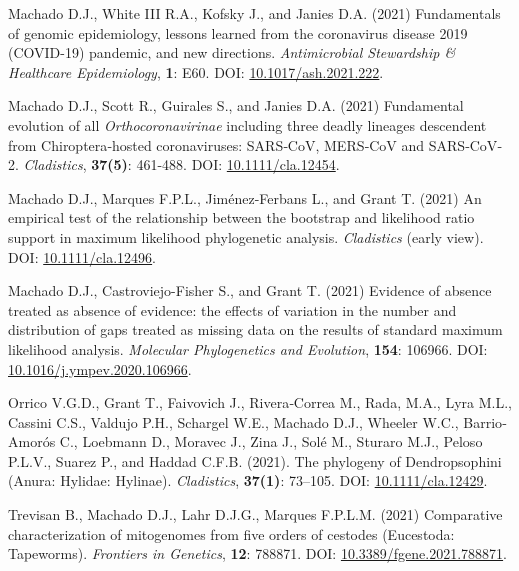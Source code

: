 \documentclass[11pt, letterpaper, sans]{moderncv}
\begin{document}
    {\setlength{\parskip}{.5em}\renewcommand{\baselinestretch}{2.0}\begin{hangparas}{.25in}{1}

		Machado D.J., White III R.A., Kofsky J., and Janies D.A. (2021) Fundamentals of genomic epidemiology, lessons learned from the coronavirus disease 2019 (COVID-19) pandemic, and new directions. \textit{Antimicrobial Stewardship \& Healthcare Epidemiology}, \textbf{1}: E60. DOI: \href{https://doi.org/10.1017/ash.2021.222}{10.1017/ash.2021.222}.

		Machado D.J., Scott R., Guirales S., and Janies D.A. (2021) Fundamental evolution of all \emph{Orthocoronavirinae} including three deadly lineages descendent from Chiroptera‐hosted coronaviruses: SARS‐CoV, MERS‐CoV and SARS‐CoV‐2. \emph{Cladistics}, \textbf{37(5)}: 461-488. DOI: \href{https://doi.org/10.1111/cla.12454}{10.1111/cla.12454}.

		Machado D.J., Marques F.P.L., Jiménez-Ferbans L., and Grant T. (2021) An empirical test of the relationship between the bootstrap and likelihood ratio support in maximum likelihood phylogenetic analysis. \textit{Cladistics} (early view). DOI: \href{https://doi.org/10.1111/cla.12496}{10.1111/cla.12496}.

		Machado D.J., Castroviejo-Fisher S., and Grant T. (2021) Evidence of absence treated as absence of evidence: the effects of variation in the number and distribution of gaps treated as missing data on the results of standard maximum likelihood analysis. \emph{Molecular Phylogenetics and Evolution}, \textbf{154}: 106966. DOI: \href{https://doi.org/10.1016/j.ympev.2020.106966}{10.1016/j.ympev.2020.106966}.

        Orrico V.G.D., Grant T., Faivovich J., Rivera‐Correa M., Rada, M.A., Lyra M.L., Cassini C.S., Valdujo P.H., Schargel W.E., Machado D.J., Wheeler W.C., Barrio‐Amorós C., Loebmann D., Moravec J., Zina J., Solé M., Sturaro M.J., Peloso P.L.V., Suarez P., and Haddad C.F.B. (2021). The phylogeny of Dendropsophini (Anura: Hylidae: Hylinae). \emph{Cladistics}, \textbf{37(1)}: 73–105. DOI: \href{https://doi.org/10.1111/cla.12429}{10.1111/cla.12429}.

        Trevisan B., Machado D.J., Lahr D.J.G., Marques F.P.L.M. (2021) Comparative characterization of mitogenomes from five orders of cestodes (Eucestoda: Tapeworms). \textit{Frontiers in Genetics}, \textbf{12}: 788871. DOI: \href{ https://doi.org/10.3389/fgene.2021.788871}{10.3389/fgene.2021.788871}.

	\end{hangparas}}
\end{document}
